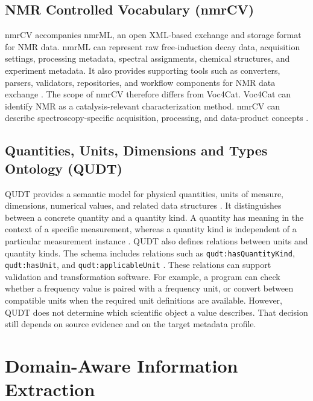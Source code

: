 \subsection{NMR Controlled Vocabulary (nmrCV)}
\label{sec:nmr-cv}

\ac{nmrCV} accompanies \ac{nmrML}, an open \ac{XML}-based exchange and storage format for \ac{NMR} data.
\ac{nmrML} can represent raw free-induction decay data, acquisition settings, processing metadata, spectral assignments, chemical structures, and experiment metadata.
It also provides supporting tools such as converters, parsers, validators, repositories, and workflow components for NMR data exchange \cite{Schober2018nmrML}.
The scope of \ac{nmrCV} therefore differs from \ac{Voc4Cat}.
\ac{Voc4Cat} can identify NMR as a catalysis-relevant characterization method.
\ac{nmrCV} can describe spectroscopy-specific acquisition, processing, and data-product concepts \cite{Schober2018nmrML}.

\subsection{Quantities, Units, Dimensions and Types Ontology (QUDT)}
\label{sec:qudt}

\acf{QUDT} provides a semantic model for physical quantities, units of measure, dimensions, numerical values, and related data structures \cite{qudt2022schema}.
It distinguishes between a concrete quantity and a quantity kind.
A quantity has meaning in the context of a specific measurement, whereas a quantity kind is independent of a particular measurement instance \cite{qudt2022schema}.
\ac{QUDT} also defines relations between units and quantity kinds.
The schema includes relations such as \texttt{qudt:\allowbreak hasQuantityKind}, \texttt{qudt:\allowbreak hasUnit}, and \texttt{qudt:\allowbreak applicableUnit} \cite{qudt2022schema}.
These relations can support validation and transformation software.
For example, a program can check whether a frequency value is paired with a frequency unit, or convert between compatible units when the required unit definitions are available.
However, \ac{QUDT} does not determine which scientific object a value describes.
That decision still depends on source evidence and on the target metadata profile.

\section{Domain-Aware Information Extraction}
\label{sec:domain-aware-information-extraction}

